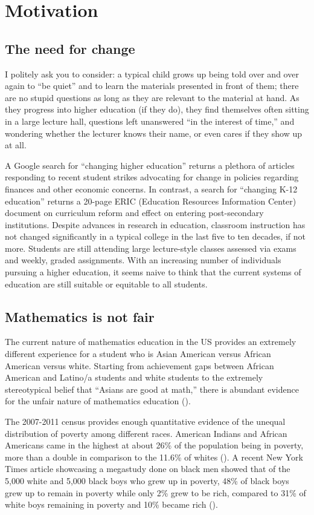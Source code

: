 \chapter{Motivation}

\section{The need for change}
I politely ask you to consider: a typical child grows up being told over and over again to ``be quiet'' and to learn the materials presented in front of them; there are no stupid questions as long as they are relevant to the material at hand. As they progress into higher education (if they do), they find themselves often sitting in a large lecture hall, questions left unanswered ``in the interest of time,'' and wondering whether the lecturer knows their name, or even cares if they show up at all.

A Google search for ``changing higher education'' returns a plethora of articles responding to recent student strikes advocating for change in policies regarding finances and other economic concerns. In contrast, a search for ``changing K-12 education'' returns a 20-page ERIC (Education Resources Information Center) document on curriculum reform and effect on entering post-secondary institutions. Despite advances in research in education, classroom instruction has not changed significantly in a typical college in the last five to ten decades, if not more. Students are still attending large lecture-style classes assessed via exams and weekly, graded assignments. With an increasing number of individuals pursuing a higher education, it seems naive to think that the current systems of education are still suitable or equitable to all students.

\section{Mathematics is not fair}
The current nature of mathematics education in the US provides an extremely different experience for a student who is Asian American versus African American versus white. Starting from achievement gaps between African American and Latino/a students and white students to  the extremely stereotypical belief that ``Asians are good at math,'' there is abundant evidence for the unfair nature of mathematics education (\cite{alfinio_flores_examining_2007}).

The 2007-2011 census provides enough quantitative evidence of the unequal distribution of poverty among different races. American Indians and African Americans came in the highest at about 26\% of the population being in poverty, more than a double in comparison to the 11.6\% of whites (\cite{macartney}). A recent New York Times article showcasing a megastudy done on black men showed that of the 5,000 white and 5,000 black boys who grew up in poverty, 48\% of black boys grew up to remain in poverty while only 2\% grew to be rich, compared to 31\% of white boys remaining in poverty and 10\% became rich (\cite{badger_extensive_2018}).

